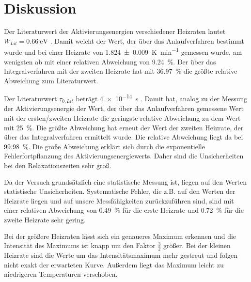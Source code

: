 \section{Diskussion}
\label{sec:Diskussion}

Der Literaturwert der Aktivierungsenergien verschiedener Heizraten lautet ${W_{Lit} = \SI{0.66}{\electronvolt}}$ \cite{lit}. Damit weicht der Wert, der über das Anlaufverfahren bestimmt wurde und bei einer Heizrate von \SI{1.824(9)}{\kelvin\per\minute} gemessen wurde, am wenigsten ab mit einer relativen Abweichung von \SI{9.24}{\percent}. Der über das Integralverfahren mit der zweiten Heizrate hat mit \SI{36.97}{\percent} die größte relative Abweichung zum Literaturwert.

Der Literaturwert $\tau_{0, Lit}$ beträgt \SI{4e-14}{\second} \cite{lit}. Damit hat, analog zu der Messung der Aktivierungsenergie der Wert, der über das Anlaufverfahren gemessene Wert mit der ersten/zweiten Heizrate die geringste relative Abweichung zu dem Wert mit \SI{25}{\percent}. 
Die größte Abweichung hat erneut der Wert der zweiten Heizrate, der über das Integralverfahren ermittelt wurde. 
Die relative Abweichung liegt da bei \SI{99.98}{\percent}. 
Die große Abweichung erklärt sich durch die exponentielle Fehlerfortpflanzung des Aktivierungsenergiewerts. Daher sind die Unsicherheiten bei den Relaxationszeiten sehr groß.

Da der Versuch grundsätzlich eine statistische Messung ist, liegen auf den Werten statistische Unsicherheiten. Systematische Fehler, die z.B. auf den Werten der Heizrate liegen und auf unsere Messfähigkeiten zurückzuführen sind, sind mit einer relativen Abweichung von \SI{0.49}{\percent} für die erste Heizrate und \SI{0.72}{\percent} für die zweite Heizrate sehr gering.

Bei der größere Heizraten lässt sich ein genaueres Maximum erkennen und die Intensität des Maximums ist knapp um den Faktor $\frac{3}{2}$ größer. Bei der kleinen Heizrate sind die Werte um das Intensitätsmaximum mehr gestreut und folgen nicht exakt der erwarteten Kurve. Außerdem liegt das Maximum leicht zu niedrigeren Temperaturen verschoben.
